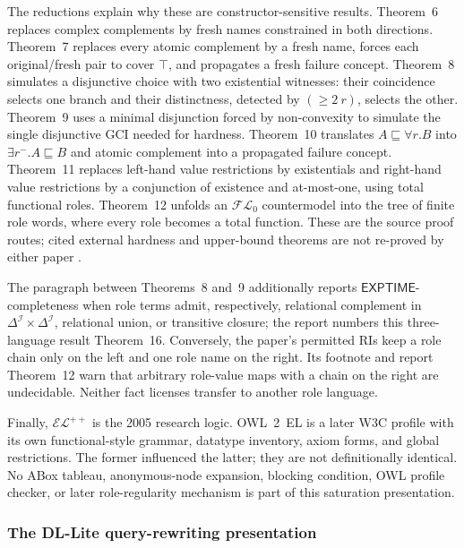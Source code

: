 The reductions explain why these are constructor-sensitive results.  Theorem~6
replaces complex complements by fresh names constrained in both directions.
Theorem~7 replaces every atomic complement by a fresh name, forces each
original/fresh pair to cover \(\top\), and propagates a fresh failure concept.
Theorem~8 simulates a disjunctive choice with two existential witnesses: their
coincidence selects one branch and their distinctness, detected by
\((\geq2\ r)\), selects the other.  Theorem~9 uses a minimal disjunction forced
by non-convexity to simulate the single disjunctive GCI needed for hardness.
Theorem~10 translates \(A\sqsubseteq\forall r.B\) into
\(\exists r^{-}.A\sqsubseteq B\) and atomic complement into a propagated
failure concept.  Theorem~11 replaces left-hand value restrictions by
existentials and right-hand value restrictions by a conjunction of existence
and at-most-one, using total functional roles.  Theorem~12 unfolds an
\(\mathcal{FL}_0\) countermodel into the tree of finite role words, where every
role becomes a total function.  These are the source proof routes; cited
external hardness and upper-bound theorems are not re-proved by either paper
\cite[\S4, thms.~6--12]{BaaderBrandtLutz2005}
\cite[\S\S5--6]{BaaderBrandtLutz2005TR}.

The paragraph between Theorems~8 and~9 additionally reports
\(\mathsf{EXPTIME}\)-completeness when role terms admit, respectively,
relational complement in \(\Delta^{\mathcal I}\times\Delta^{\mathcal I}\),
relational union, or transitive closure; the report numbers this
three-language result Theorem~16.  Conversely, the paper's permitted RIs keep
a role chain only on the left and one role name on the right.  Its footnote and
report Theorem~12 warn that arbitrary role-value maps with a chain on the
right are undecidable.  Neither fact licenses transfer to another role
language.

Finally, \(\mathcal{EL}^{++}\) is the 2005 research logic.  OWL~2~EL is a
later W3C profile with its own functional-style grammar, datatype inventory,
axiom forms, and global restrictions.  The former influenced the latter; they
are not definitionally identical.  No ABox tableau, anonymous-node expansion,
blocking condition, OWL profile checker, or later role-regularity mechanism is
part of this saturation presentation.

\subsubsection{The DL-Lite query-rewriting presentation}

